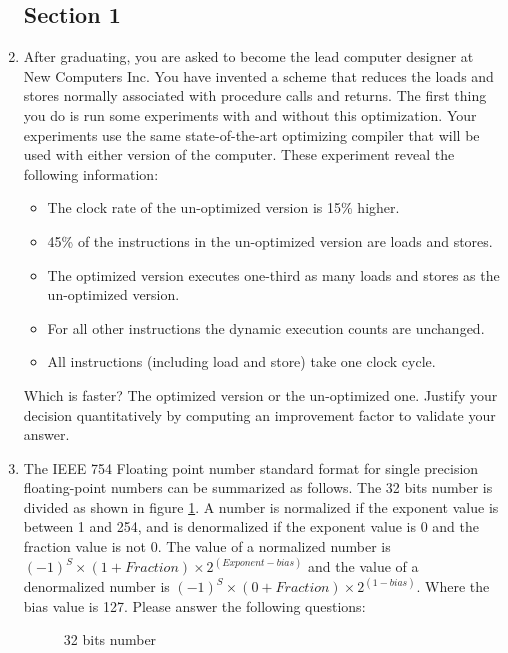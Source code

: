 \documentclass[main.tex]{subfiles}
\begin{document}
\begin{enumerate}

\subsection{Section 1}

\item After graduating, you are asked to become the lead computer designer at New Computers Inc. You have invented a scheme that reduces the loads and stores normally associated with procedure calls and returns. The first thing you do is run some experiments with and without this optimization. Your experiments use the same state-of-the-art optimizing compiler that will be used with either version of the computer. These experiment reveal the following information:
\begin{itemize}
    \item The clock rate of the un-optimized version is 15\% higher.
    \item 45\% of the instructions in the un-optimized version are loads and stores.
    \item The optimized version executes one-third as many loads and stores as the un-optimized version.
    \item For all other instructions the dynamic execution counts are unchanged.
    \item All instructions (including load and store) take one clock cycle.
\end{itemize}
Which is faster? The optimized version or the un-optimized one. Justify your decision quantitatively by computing an improvement factor to validate your answer.

\item The IEEE 754 Floating point number standard format for single precision floating-point numbers can be summarized as follows. The 32 bits number is divided as shown in figure \ref{fig:f1}. A number is normalized if the exponent value is between 1 and 254, and is denormalized if the exponent value is 0 and the fraction value is not 0. The value of a normalized number is $(-1)^S \times (1+Fraction) \times 2^{(Exponent-bias)}$ and the value of a denormalized number is $(-1)^S \times (0+Fraction) \times 2^{(1-bias)}$. Where the bias value is 127. Please answer the following questions:

\begin{figure}
\centering{}
\caption{32 bits number}
\label{fig:f1}
\end{figure}


\end{enumerate}
\end{document}
